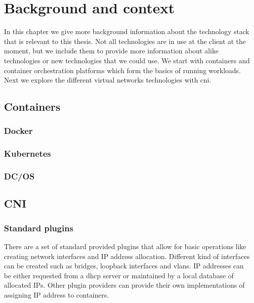\chapter{Background and context}

In this chapter we give more background information about the technology stack that is relevant to this thesis. Not all technologies are in use at the client at the moment, but we include them to provide more information about alike technologies or new technologies that we could use. We start with containers and container orchestration platforms which form the basics of running workloads. Next we explore the different virtual networks technologies with \gls{cni}.

\section{Containers}
\subsection{Docker}
\subsection{Kubernetes}
\subsection{DC/OS}

\section{CNI}

\subsection{Standard plugins}
There are a set of standard provided plugins\cite{cni_plugin} that allow for basic operations like creating network interfaces and IP address allocation. Different kind of interfaces can be created such as bridges, loopback interfaces and vlans. IP addresses can be either requested from a \gls{dhcp} server or maintained by a local database of allocated IPs. Other plugin providers can provide their own implementations of assigning IP address to containers.

